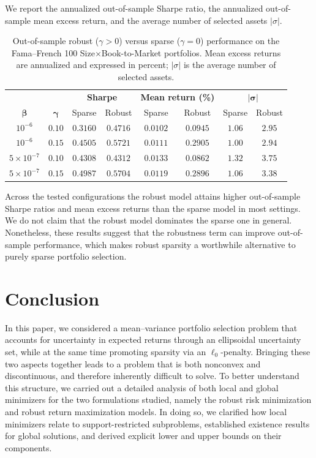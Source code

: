 \documentclass[11pt]{article}
\theoremstyle{plain}
\theoremstyle{definition}
\theoremstyle{plain}
\newcommand{\abs}[1]{\left\lvert#1\right\rvert}
\begin{document}
We report the annualized out-of-sample Sharpe ratio, the annualized out-of-sample mean excess return, and the average number of selected assets $\abs{\sigma}$.
\begin{table}[!htbp]
\centering
\caption{{Out-of-sample robust ($\gamma>0$) versus sparse ($\gamma=0$)
performance on the Fama--French 100 Size$\times$Book-to-Market portfolios. Mean excess
returns are annualized and expressed in percent; $\abs{\sigma}$ is the average number of
selected assets.}}
\label{tab:oos}
{\setlength{\tabcolsep}{5pt}
\begin{tabular}{cc cc cc cc}
\hline
 & & \multicolumn{2}{c}{\textbf{Sharpe}} & \multicolumn{2}{c}{\textbf{Mean return (\%)}}
   & \multicolumn{2}{c}{$\boldsymbol{\abs{\sigma}}$} \\
$\boldsymbol{\beta}$ & $\boldsymbol{\gamma}$ & Sparse & Robust & Sparse & Robust
   & Sparse & Robust \\
\hline
$10^{-6}$ & $0.10$ & $0.3160$ & $0.4716$ & $0.0102$ & $0.0945$ & $1.06$ & $2.95$ \\
$10^{-6}$ & $0.15$ & $0.4505$ & $0.5721$ & $0.0111$ & $0.2905$ & $1.00$ & $2.94$ \\
$5\times10^{-7}$ & $0.10$ & $0.4308$ & $0.4312$ & $0.0133$ & $0.0862$ & $1.32$ & $3.75$ \\
$5\times10^{-7}$ & $0.15$ & $0.4987$ & $0.5704$ & $0.0119$ & $0.2896$ & $1.06$ & $3.38$ \\
\hline
\end{tabular}
}
\end{table}
Across the tested configurations the robust model attains higher out-of-sample Sharpe ratios and mean excess returns than the sparse model in most settings. We do not claim that the robust model dominates the sparse one in general. Nonetheless, these results suggest that the robustness term can improve out-of-sample performance, which makes robust sparsity a worthwhile alternative to purely sparse portfolio selection.
\section{Conclusion}\label{conclusion}
In this paper, we considered a mean–variance portfolio selection problem that accounts for uncertainty in expected returns through an ellipsoidal uncertainty set, while at the same time promoting sparsity via an $\ell_0$-penalty. Bringing these two aspects together leads to a problem that is both nonconvex and discontinuous, and therefore inherently difficult to solve. To better understand this structure, we carried out a detailed analysis of both local and global minimizers for the two formulations studied, namely the robust risk minimization and robust return maximization models. In doing so, we clarified how local minimizers relate to support-restricted subproblems, established existence results for global solutions, and derived explicit lower and upper bounds on their components.
\end{document}
